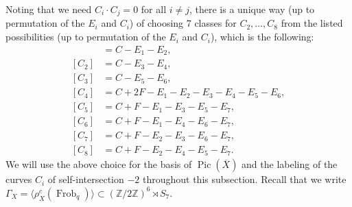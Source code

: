 \documentclass[a4paper, 11pt, reqno]{amsart}
\numberwithin{equation}{section} \numberwithin{figure}{section}
\DeclareMathOperator{\Pic}{Pic}
\DeclareMathOperator{\Frob}{Frob}
\def \Z {{\mathbb Z}}
\theoremstyle{definition}
\numberwithin{lemma}{section}
\begin{document}

Noting that we need $C_i \cdot C_j = 0$ for all $i \neq j$, there is a unique way (up to permutation of the $E_i$ and $C_i$) of choosing 7 classes for $C_2, \ldots, C_8$ from the listed possibilities (up to permutation of the $E_i$ and $C_i$), which is the following: 
\begin{align*}
    [C_1] &= C - E_1 - E_2,\\
    [C_2] &= C - E_3 - E_4,\\
    [C_3] &= C - E_5 - E_6,\\
    [C_4] &= C + 2F - E_1 - E_2 - E_3 - E_4 - E_5 - E_6,\\
    [C_5] &= C + F - E_1 - E_3 - E_5 - E_7,\\
    [C_6] &= C + F - E_1 - E_4 - E_6 - E_7,\\
    [C_7] &= C + F - E_2 - E_3 - E_6 - E_7,\\
    [C_8] &= C + F - E_2 - E_4 - E_5 - E_7.
\end{align*}
We will use the above choice for the basis of $\Pic(\overline{X})$ and the labeling of the curves $C_i$ of self-intersection $-2$ throughout this subsection. Recall that we write $\Gamma_X = \langle \rho_X^c(\Frob_q)\rangle \subset (\Z/2\Z)^{6} \rtimes S_7$. 
\end{document}
